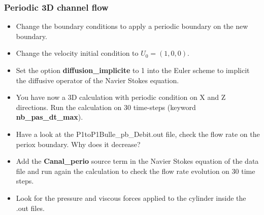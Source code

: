 \documentclass[10pt, hyperref={unicode=true,pdfusetitle, bookmarks=true,bookmarksnumbered=false,bookmarksopen=false, breaklinks=false,pdfborder={0 0 1},backref=true,colorlinks=true,linkcolor=darkblue,pageanchor}]{beamer}
\begin{document}
\begin{frame}
\frametitle{Periodic 3D channel flow}
\begin{block}{}

\begin{itemize}
\item Change the boundary conditions to apply a periodic boundary on the new boundary. 

\item Change the velocity initial condition to $U_0=(1,0,0)$. 

\item Set the option \textbf{diffusion\_implicite} to 1 into the Euler scheme to implicit the diffusive operator of the Navier Stokes equation.

\item You have now a 3D calculation with periodic condition on X and Z directions. Run the calculation on 30 time-steps (keyword \textbf{nb\_pas\_dt\_max}).

\item Have a look at the P1toP1Bulle\_pb\_Debit.out file, check the flow rate on the periox boundary. Why does it decrease?

\item Add the \textbf{Canal\_perio} source term in the Navier Stokes equation of the data file and run again the calculation to check the flow rate evolution on 30 time steps. 

\item Look for the pressure and viscous forces applied to the cylinder inside the .out files.
\end{itemize}

\end{block}
\end{frame}
\end{document}
